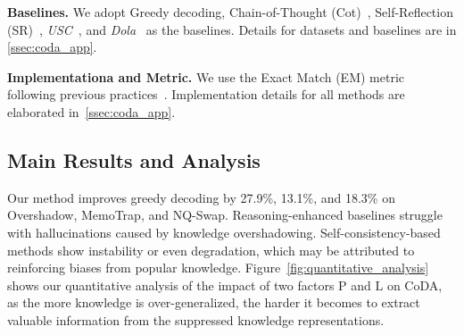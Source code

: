 \vspace{1mm}
\noindent \textbf{Baselines.} We adopt Greedy decoding, Chain-of-Thought (Cot)~\cite{wei2022chain}, Self-Reflection (SR)~\cite{madaan2024self}, \textit{USC}~\cite{chen2023universal}, and \textit{Dola}~\citet{chuang2023dola} as the baselines. Details for datasets and baselines are in \ref{ssec:coda_app}.


\vspace{1mm}
\noindent \textbf{Implementationa and Metric.}
We use the Exact Match (EM) metric following previous practices~\cite{longpre-etal-2021-entity}. Implementation details for all methods are elaborated in~\ref{ssec:coda_app}.



\subsection{Main Results and Analysis}
Our method improves greedy decoding by 27.9\%, 13.1\%, and 18.3\% on Overshadow, MemoTrap, and NQ-Swap.
Reasoning-enhanced baselines struggle with hallucinations caused by knowledge overshadowing. Self-consistency-based methods show instability or even degradation, which may be attributed to reinforcing biases from popular knowledge.
Figure~\ref{fig:quantitative_analysis} shows our quantitative analysis of the impact of two factors $\text{P}$ and $\text{L}$ on CoDA, as the more knowledge is over-generalized, the harder it becomes to extract valuable information from the suppressed knowledge representations. 


